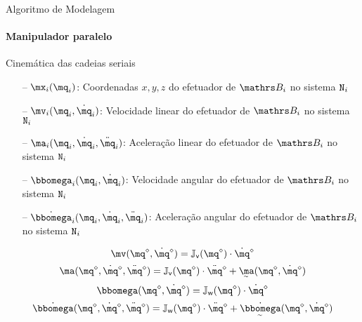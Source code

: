 \documentclass[25pt,landscape]{beamer}
\begin{document}
\begin{frame}{Algoritmo de Modelagem}
    \framesubtitle{Manipulador paralelo}
    \begin{block}{Cinemática das cadeias seriais}
		\begin{itemize}
			\item[--] $\mx_i(\mq_i)$: Coordenadas $x,y,z$ do efetuador de $\ssB_i$ no sistema $\mathtt{N}_i$
			\item[--] $\mv_i(\mq_i, \dot{\mq}_i)$: Velocidade linear do efetuador de $\ssB_i$ no sistema $\mathtt{N}_i$
			\item[--] $\ma_i(\mq_i, \dot{\mq}_i, \ddot{\mq}_i)$: Aceleração linear do efetuador de $\ssB_i$ no sistema $\mathtt{N}_i$
			\item[--] $\momega_i(\mq_i, \dot{\mq}_i)$: Velocidade angular do efetuador de $\ssB_i$ no sistema $\mathtt{N}_i$
			\item[--] $\dot{\momega}_i(\mq_i, \dot{\mq}_i, \ddot{\mq}_i)$: Aceleração angular do efetuador de $\ssB_i$ no sistema $\mathtt{N}_i$
			\\[12pt]
		\end{itemize}
		$$ \mv(\mq^\diamond, \dot{\mq}^\diamond) = \mJ_{\mathsf{v}}(\mq^\diamond) \cdot \dot{\mq}^\diamond $$
    	$$ \ma(\mq^\diamond, \dot{\mq}^\diamond, \ddot{\mq}^\diamond) = \mJ_{\mathsf{v}}(\mq^\diamond) \cdot \ddot{\mq}^\diamond + \underaccent{\sim}{\ma}(\mq^\diamond, \dot{\mq}^\diamond) $$
    	$$ \momega(\mq^\diamond, \dot{\mq}^\diamond) = \mJ_{\mathsf{w}}(\mq^\diamond) \cdot \dot{\mq}^\diamond $$
    	$$ \dot{\momega}(\mq^\diamond, \dot{\mq}^\diamond, \ddot{\mq}^\diamond) = \mJ_{\mathsf{w}}(\mq^\diamond) \cdot \ddot{\mq}^\diamond + \underaccent{\sim}{\dot{\momega}}(\mq^\diamond, \dot{\mq}^\diamond) $$
    \end{block}
\end{frame}
\end{document}
